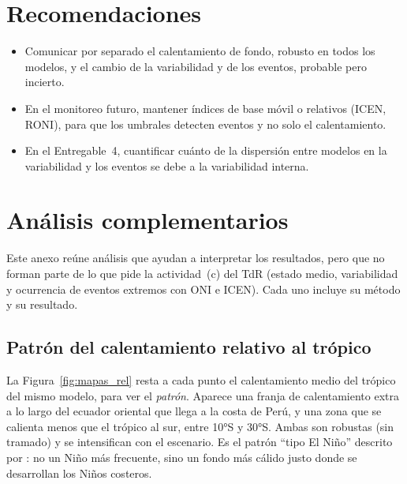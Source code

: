 \documentclass[11pt,a4paper]{article}
\begin{document}
\section{Recomendaciones}
\label{sec:recomendaciones}

\begin{itemize}
\item Comunicar por separado el calentamiento de fondo, robusto en todos los modelos, y el cambio de la variabilidad y de los eventos, probable pero incierto.
\item En el monitoreo futuro, mantener índices de base móvil o relativos (ICEN, RONI), para que los umbrales detecten eventos y no solo el calentamiento.
\item En el Entregable~4, cuantificar cuánto de la dispersión entre modelos en la variabilidad y los eventos se debe a la variabilidad interna.
\end{itemize}

\clearpage
\begingroup
\setlength{\parskip}{0pt}
\setlength{\bibsep}{2pt} %


\endgroup

\clearpage
\appendix
\renewcommand{\thefigure}{A\arabic{figure}}
\setcounter{figure}{0}

\renewcommand{\thetable}{A\arabic{table}}
\setcounter{table}{0}
\section{Análisis complementarios}
\label{sec:anexo}

Este anexo reúne análisis que ayudan a interpretar los resultados, pero que no forman parte de lo que pide la actividad~(c) del TdR (estado medio, variabilidad y ocurrencia de eventos extremos con ONI e ICEN).
Cada uno incluye su método y su resultado.

\subsection{Patrón del calentamiento relativo al trópico}
\label{sec:a_patron}

La Figura~\ref{fig:mapas_rel} resta a cada punto el calentamiento medio del trópico del mismo modelo, para ver el \emph{patrón}.
Aparece una franja de calentamiento extra a lo largo del ecuador oriental que llega a la costa de Perú, y una zona que se calienta menos que el trópico al sur, entre 10°S y 30°S.
Ambas son robustas (sin tramado) y se intensifican con el escenario.
Es el patrón ``tipo El Niño'' descrito por \citet{xie2010}: no un Niño más frecuente, sino un fondo más cálido justo donde se desarrollan los Niños costeros.
\end{document}
